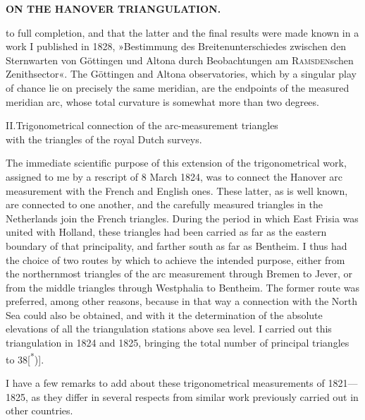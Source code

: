 \par\clearpage
\noindent\null\hfill{\small\textbf{ON THE HANOVER TRIANGULATION.}}\hfill{}\par\medskip

\noindent to full completion, and that the latter and the final results were made known in a work I published in 1828, »Bestimmung des Breitenunterschiedes zwischen den Sternwarten von Göttingen und Altona durch Beobachtungen am \textsc{Ramsden}schen Zenithsector«. The Göttingen and Altona observatories, which by a singular play of chance lie on precisely the same meridian, are the endpoints of the measured meridian arc, whose total curvature is somewhat more than two degrees.

\begin{center}
II.\quad Trigonometrical connection of the arc-measurement triangles\\
with the triangles of the royal Dutch surveys.
\end{center}

\par\noindent\hspace*{\parindent}The immediate scientific purpose of this extension of the trigonometrical work, assigned to me by a rescript of 8 March 1824, was to connect the Hanover arc measurement with the French and English ones. These latter, as is well known, are connected to one another, and the carefully measured triangles in the Netherlands join the French triangles. During the period in which East Frisia was united with Holland, these triangles had been carried as far as the eastern boundary of that principality, and farther south as far as Bentheim. I thus had the choice of two routes by which to achieve the intended purpose, either from the northernmost triangles of the arc measurement through Bremen to Jever, or from the middle triangles through Westphalia to Bentheim. The former route was preferred, among other reasons, because in that way a connection with the North Sea could also be obtained, and with it the determination of the absolute elevations of all the triangulation stations above sea level. I carried out this triangulation in 1824 and 1825, bringing the total number of principal triangles to 38[\textsuperscript{*})].

\par\medskip
\par\noindent\hspace*{\parindent}I have a few remarks to add about these trigonometrical measurements of 1821---1825, as they differ in several respects from similar work previously carried out in other countries.

